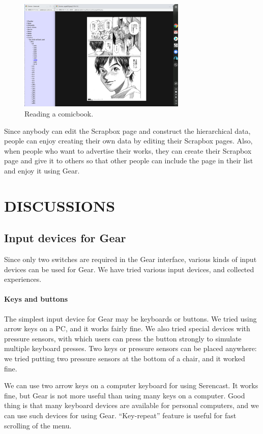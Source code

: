 \documentclass{article}
\def\SC{\textsf{\small Serencast}}
\def\SB{\textsf{\small Scrapbox}}
\begin{document}
\begin{figure}[H]
\centerline{\includegraphics[width=80mm,bb=0 0 2400 1600]{figures/blackjack.png}}
\caption{Reading a comicbook.}
\label{blackjack}
\end{figure}

Since anybody can edit the {\SB} page and construct the hierarchical data,
people can enjoy creating their own data by editing their {\SB} pages.
Also, when people who want to advertise their works,
they can create their {\SB} page
and give it to others so that other people can include the page
in their list and enjoy it using Gear.

\section{DISCUSSIONS}

\subsection{Input devices for Gear}

Since only two switches are required in the Gear interface,
various kinds of input devices can be used for Gear.
We have tried various input devices, and collected experiences.

\paragraph{Keys and buttons}

The simplest input device for Gear may be keyboards or buttons.
We tried using arrow keys on a PC, and it works fairly fine.
We also tried special devices with pressure sensors, with which users can press the button strongly to simulate multiple keyboard presses.
Two keys or pressure sensors can be placed anywhere: we tried putting two pressure sensors at the bottom of a chair, and it worked fine.

We can use two arrow keys on a computer keyboard for using {\SC}.
It works fine, but Gear is not more useful than using many keys on a computer.
%
Good thing is that many keyboard devices are available for personal computers,
and we can use such devices for using Gear.
``Key-repeat'' feature is useful for fast scrolling of the menu.
\end{document}

